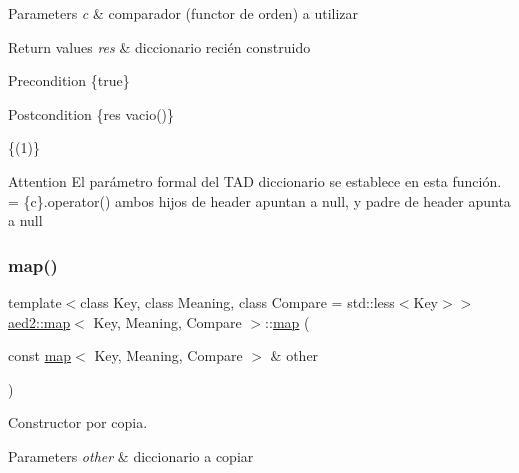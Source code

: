 \begin{DoxyParams}{Parameters}
{\em c} & comparador (functor de orden) a utilizar \\
\hline
\end{DoxyParams}

\begin{DoxyRetVals}{Return values}
{\em res} & diccionario recién construido\\
\hline
\end{DoxyRetVals}
\begin{DoxyPrecond}{Precondition}
\{true\} 
\end{DoxyPrecond}
\begin{DoxyPostcond}{Postcondition}
\{res  vacio()\}
\end{DoxyPostcond}
\{(1)\}

\begin{DoxyAttention}{Attention}
El parámetro formal  del T\+AD diccionario se establece en esta función.  = \{c\}.operator() ambos hijos de header apuntan a null, y padre de header apunta a null 
\end{DoxyAttention}
\mbox{\label{classaed2_1_1map_a7a77950a3d8e637bfa7cf5dcd904f257}} 
\subsubsection{\texorpdfstring{map()}{map()}\hspace{0.1cm}{\footnotesize\ttfamily [5/6]}}
{\footnotesize\ttfamily template$<$class Key, class Meaning, class Compare = std\+::less$<$\+Key$>$$>$ \\
\hyperlink{classaed2_1_1map}{aed2\+::map}$<$ Key, Meaning, Compare $>$\+::\hyperlink{classaed2_1_1map}{map} (\begin{DoxyParamCaption}\item[{const \hyperlink{classaed2_1_1map}{map}$<$ Key, Meaning, Compare $>$ \&}]{other }\end{DoxyParamCaption})\hspace{0.3cm}{\ttfamily [inline]}}



Constructor por copia. 


\begin{DoxyParams}{Parameters}
{\em other} & diccionario a copiar \\
\hline
\end{DoxyParams}

